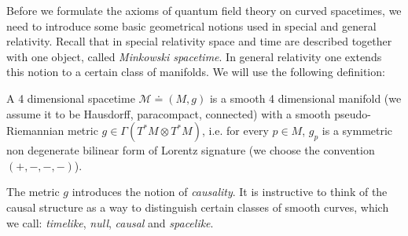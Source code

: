 \documentclass[11pt]{article}
\newcommand{\Mcal}{\mathcal{M}}
\newcommand{\RR}{\mathbb{R}}           %
\newcommand{\al}{\alpha}
\newcommand{\1}{\mathds{1}}                         %
\begin{document}
Before we formulate the axioms of quantum field theory on curved spacetimes, we need to introduce some basic geometrical notions used in special and general relativity. Recall that in special relativity space and time are described together with one object, called \textit{Minkowski spacetime}. In general relativity one extends this notion to a certain class of manifolds. We will use the following definition:
\begin{df}
A 4 dimensional spacetime $\Mcal\doteq(M,g)$ is a smooth 4 dimensional manifold (we assume it to be Hausdorff, paracompact, connected) with a smooth pseudo-Riemannian metric $g\in\Gamma(T^*M\otimes T^*M)$, i.e. for every $p\in M$, $g_p$ is a symmetric non degenerate bilinear form of Lorentz signature (we choose the convention $(+,-,-,-)$).
\end{df}
The metric $g$ introduces the notion of \textit{causality}. It is instructive to think of the causal structure as a way to distinguish certain classes of smooth curves, which we call: \textit{timelike}, \textit{null}, \textit{causal} and \textit{spacelike}.
\end{document}

